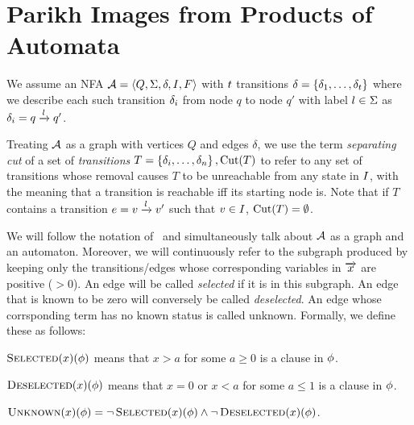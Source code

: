 \documentclass[runningheads]{llncs}
\newif\ifoutline
\newcommand{\contents}[1]{\ifoutline{\color{blue}
    \begin{itemize}
    #1
    \end{itemize}
  }\fi}
\begin{document}
\section{Parikh Images from Products of Automata}

\contents{
\item additional rules needed for products
\item backjumping and conflict-driven learning
}

We assume an NFA $\mathcal{A} = \left\langle Q, \Sigma, \delta, I,
F\right\rangle$ with $t$ transitions $\delta =
\left\{\delta_{1}, \ldots, \delta_{t}\right\}$ where we describe each
such transition $\delta_i$ from node $q$ to node $q'$ with label $l \in \Sigma$ as
$\delta_i = q \xrightarrow{l} q'$.

Treating $\mathcal{A}$ as a graph with vertices $Q$ and edges $\delta$, we use
the term \textit{separating cut} of a set of \textit{transitions} $T =
\left\{\delta_i, \ldots, \delta_n\right\}, \operatorname{Cut}(T)$ to refer to any set
of transitions whose removal causes $T$ to be unreachable from any state in
$I$, with the meaning that a transition is reachable iff its starting
node is. Note that if $T$ contains a transition $e =
v \xrightarrow{l} v'$ such that $v \in I$, $\operatorname{Cut}(T) =
\emptyset$.

We will follow the notation of~\cite{generate-parikh-image} and simultaneously talk
about $\mathcal{A}$ as a graph and an automaton. Moreover, we will continuously
refer to the subgraph produced by keeping only the transitions/edges whose
corresponding variables in $\overrightarrow{x}$ are positive ($> 0$). An edge will
be called \textit{selected} if it is in this subgraph. An edge that is known to be zero
will conversely be called \textit{deselected}. An edge whose corrsponding term has no
known status is called unknown. Formally, we define these as follows:

\begin{definition}
  $\operatorname{\textsc{Selected}}(x)(\phi)$ means that $x > a$ for some $a \geq 0$ is a clause
  in $\phi$.
  \end{definition}
  
  \begin{definition}
  $\operatorname{\textsc{Deselected}}(x)(\phi)$ means that $x = 0$ or $x < a$ for some $a \leq 1$
  is a clause in $\phi$.
  \end{definition}
  
  \begin{definition}
  $\operatorname{\textsc{Unknown}}(x)(\phi) = \lnot\operatorname{\textsc{Selected}}(x)(\phi)\land\lnot\operatorname{\textsc{Deselected}}(x)(\phi)$.
  \end{definition}
\end{document}
